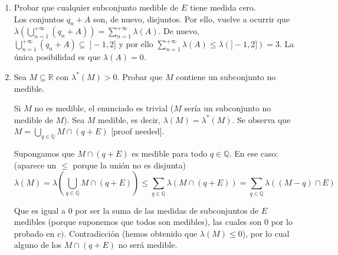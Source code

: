 \begin{enumerate}[label=\alph*)]
	\item Probar que cualquier subconjunto medible de $E$ tiene medida cero. \\
	
	Los conjuntos $q_n + A$ son, de nuevo, disjuntos. Por ello, vuelve a ocurrir que $\displaystyle \lambda(\bigcup_{n = 1}^{+\infty} (q_n + A)) = \sum_{n=1}^{+\infty} \lambda(A)$. De nuevo, $\displaystyle \bigcup_{n=1}^{+\infty} (q_n + A) \subseteq \ ]-1, 2]$ y por ello $\displaystyle \sum_{n=1}^{+\infty} \lambda(A) \le \lambda(]-1, 2]) = 3$. La única posibilidad es que $\lambda(A) = 0$.
	
	\item Sea $M \subseteq \mathbb R$ con $\lambda^*(M) > 0$. Probar que $M$ contiene un subconjunto no medible.
	
	Si $M$ no es medible, el enunciado es trivial ($M$ sería un subconjunto no medible de $M$). Sea $M$ medible, es decir, $\lambda(M) = \lambda^*(M)$. Se observa que $\displaystyle M = \bigcup_{q \in \mathbb Q} M \cap (q + E)$ [proof needed].
	
	Supongamos que $M\cap (q + E)$ es medible para todo $q \in \mathbb Q$. En ese caso: (aparece un $\le$ porque la unión no es disjunta)
	$$\displaystyle \lambda(M) = \lambda(\bigcup_{q \in \mathbb Q} M \cap (q + E)) \le \sum_{q \in \mathbb Q} \lambda(M \cap (q+E))  = \sum_{q \in \mathbb Q} \lambda((M-q) \cap E)$$
	
	Que es igual a $0$ por ser la suma de las medidas de subconjuntos de $E$ medibles (porque suponemos que todos son medibles), las cuales son $0$ por lo probado en $c)$. Contradicción (hemos obtenido que $\lambda(M) \le 0$), por lo cual alguno de los $M\cap (q + E)$ no será medible.
\end{enumerate}
 
